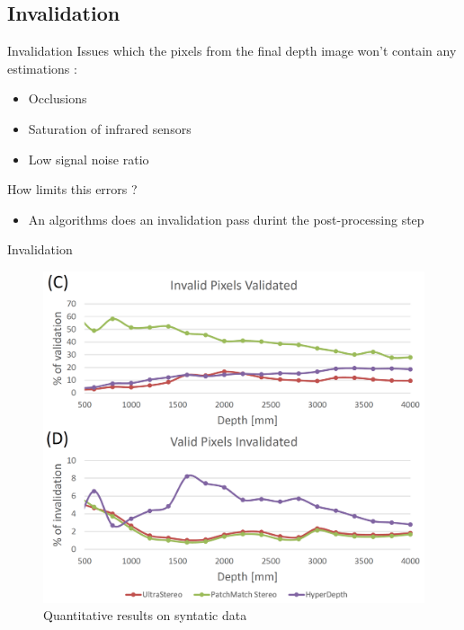 %
%

\subsection{Invalidation}
\begin{frame}{Invalidation}
Issues which the pixels from the final depth image won't contain any estimations :
\begin{itemize}
\item Occlusions
\item Saturation of infrared sensors
\item Low signal noise ratio
\end{itemize}
How limits this errors ?
\begin{itemize}
\item An algorithms does an invalidation pass durint the post-processing step
\end{itemize}
\end{frame}

\begin{frame}{Invalidation}
\begin{figure}
\includegraphics[scale=0.25]{pictures/invalidation}
\caption{Quantitative results on syntatic data}
\end{figure}
\end{frame}

